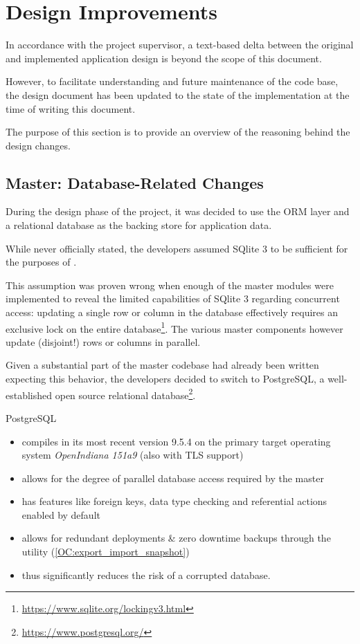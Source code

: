 \section{Design Improvements}

In accordance with the project supervisor, a text-based delta between the original and implemented application design
is beyond the scope of this document.

However, to facilitate understanding and future maintenance of the code base, the design document has been updated to the state of
the implementation at the time of writing this document.

The purpose of this section is to provide an overview of the reasoning behind the design changes.


\subsection{Master: Database-Related Changes}

During the design phase of the project, it was decided to use the  ORM layer and a relational database as the backing store
for \mamid application data.

While never officially stated, the developers assumed SQlite 3 to be sufficient for the purposes of \mamid.

This assumption was proven wrong when enough of the master modules were implemented to reveal the limited capabilities of SQlite 3 regarding
concurrent access: updating a single row or column in the database effectively requires an exclusive lock on the entire 
database\footnote{\url{https://www.sqlite.org/lockingv3.html}}.
The various master components however update (disjoint!) rows or columns in parallel.

Given a substantial part of the master codebase had already been written expecting this behavior, the developers decided to switch to
PostgreSQL, a well-established open source relational database\footnote{\url{https://www.postgresql.org/}}.

PostgreSQL
\begin{itemize}
\item compiles in its most recent version 9.5.4 on the primary target operating system \textit{OpenIndiana 151a9} (also with TLS support)
\item allows for the degree of parallel database access required by the master
\item has features like foreign keys, data type checking and referential actions enabled by default %
\item allows for redundant deployments \& zero downtime backups through the  utility 
(\ref{OC:export_import_snapshot})
\item thus significantly reduces the risk of a corrupted database.
\end{itemize}


